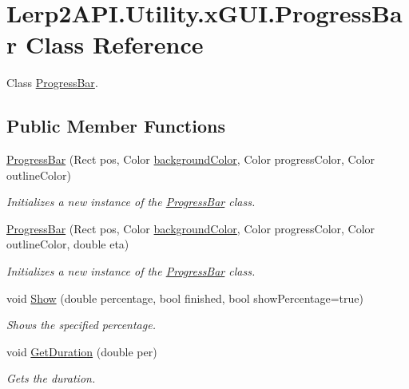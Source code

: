 \hypertarget{class_lerp2_a_p_i_1_1_utility_1_1x_g_u_i_1_1_progress_bar}{}\section{Lerp2\+A\+P\+I.\+Utility.\+x\+G\+U\+I.\+Progress\+Bar Class Reference}
\label{class_lerp2_a_p_i_1_1_utility_1_1x_g_u_i_1_1_progress_bar}


Class \hyperlink{class_lerp2_a_p_i_1_1_utility_1_1x_g_u_i_1_1_progress_bar}{Progress\+Bar}.  


\subsection*{Public Member Functions}
\begin{DoxyCompactItemize}
\item 
\hyperlink{class_lerp2_a_p_i_1_1_utility_1_1x_g_u_i_1_1_progress_bar_a9333d50d1421df81e926ece7820b9992}{Progress\+Bar} (Rect pos, Color \hyperlink{class_lerp2_a_p_i_1_1_utility_1_1x_g_u_i_1_1_progress_bar_a8c9f8f47d4ad863cb7811cfe59387bab}{background\+Color}, Color progress\+Color, Color outline\+Color)
\begin{DoxyCompactList}\small\item\em Initializes a new instance of the \hyperlink{class_lerp2_a_p_i_1_1_utility_1_1x_g_u_i_1_1_progress_bar}{Progress\+Bar} class. \end{DoxyCompactList}\item 
\hyperlink{class_lerp2_a_p_i_1_1_utility_1_1x_g_u_i_1_1_progress_bar_a1ab39a00d6557a35dbc0581324ab2193}{Progress\+Bar} (Rect pos, Color \hyperlink{class_lerp2_a_p_i_1_1_utility_1_1x_g_u_i_1_1_progress_bar_a8c9f8f47d4ad863cb7811cfe59387bab}{background\+Color}, Color progress\+Color, Color outline\+Color, double eta)
\begin{DoxyCompactList}\small\item\em Initializes a new instance of the \hyperlink{class_lerp2_a_p_i_1_1_utility_1_1x_g_u_i_1_1_progress_bar}{Progress\+Bar} class. \end{DoxyCompactList}\item 
void \hyperlink{class_lerp2_a_p_i_1_1_utility_1_1x_g_u_i_1_1_progress_bar_a01ef3446be2bc183a5a0039588b21a9f}{Show} (double percentage, bool finished, bool show\+Percentage=true)
\begin{DoxyCompactList}\small\item\em Shows the specified percentage. \end{DoxyCompactList}\item 
void \hyperlink{class_lerp2_a_p_i_1_1_utility_1_1x_g_u_i_1_1_progress_bar_a971cda756147f0b4233febf2648ea967}{Get\+Duration} (double per)
\begin{DoxyCompactList}\small\item\em Gets the duration. \end{DoxyCompactList}\end{DoxyCompactItemize}
